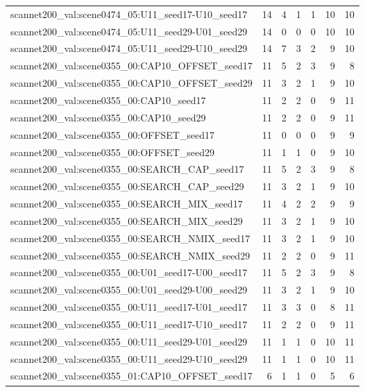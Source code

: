 \begin{table}[t]
\begin{tabular}{lrrrrrr}
scannet200\_val:scene0474\_05:U11\_seed17-U10\_seed17 & 14 & 4 & 1 & 1 & 10 & 10 \\
scannet200\_val:scene0474\_05:U11\_seed29-U01\_seed29 & 14 & 0 & 0 & 0 & 10 & 10 \\
scannet200\_val:scene0474\_05:U11\_seed29-U10\_seed29 & 14 & 7 & 3 & 2 & 9 & 10 \\
scannet200\_val:scene0355\_00:CAP10\_OFFSET\_seed17 & 11 & 5 & 2 & 3 & 9 & 8 \\
scannet200\_val:scene0355\_00:CAP10\_OFFSET\_seed29 & 11 & 3 & 2 & 1 & 9 & 10 \\
scannet200\_val:scene0355\_00:CAP10\_seed17 & 11 & 2 & 2 & 0 & 9 & 11 \\
scannet200\_val:scene0355\_00:CAP10\_seed29 & 11 & 2 & 2 & 0 & 9 & 11 \\
scannet200\_val:scene0355\_00:OFFSET\_seed17 & 11 & 0 & 0 & 0 & 9 & 9 \\
scannet200\_val:scene0355\_00:OFFSET\_seed29 & 11 & 1 & 1 & 0 & 9 & 10 \\
scannet200\_val:scene0355\_00:SEARCH\_CAP\_seed17 & 11 & 5 & 2 & 3 & 9 & 8 \\
scannet200\_val:scene0355\_00:SEARCH\_CAP\_seed29 & 11 & 3 & 2 & 1 & 9 & 10 \\
scannet200\_val:scene0355\_00:SEARCH\_MIX\_seed17 & 11 & 4 & 2 & 2 & 9 & 9 \\
scannet200\_val:scene0355\_00:SEARCH\_MIX\_seed29 & 11 & 3 & 2 & 1 & 9 & 10 \\
scannet200\_val:scene0355\_00:SEARCH\_NMIX\_seed17 & 11 & 3 & 2 & 1 & 9 & 10 \\
scannet200\_val:scene0355\_00:SEARCH\_NMIX\_seed29 & 11 & 2 & 2 & 0 & 9 & 11 \\
scannet200\_val:scene0355\_00:U01\_seed17-U00\_seed17 & 11 & 5 & 2 & 3 & 9 & 8 \\
scannet200\_val:scene0355\_00:U01\_seed29-U00\_seed29 & 11 & 3 & 2 & 1 & 9 & 10 \\
scannet200\_val:scene0355\_00:U11\_seed17-U01\_seed17 & 11 & 3 & 3 & 0 & 8 & 11 \\
scannet200\_val:scene0355\_00:U11\_seed17-U10\_seed17 & 11 & 2 & 2 & 0 & 9 & 11 \\
scannet200\_val:scene0355\_00:U11\_seed29-U01\_seed29 & 11 & 1 & 1 & 0 & 10 & 11 \\
scannet200\_val:scene0355\_00:U11\_seed29-U10\_seed29 & 11 & 1 & 1 & 0 & 10 & 11 \\
scannet200\_val:scene0355\_01:CAP10\_OFFSET\_seed17 & 6 & 1 & 1 & 0 & 5 & 6 \\

\end{tabular}
\end{table}
